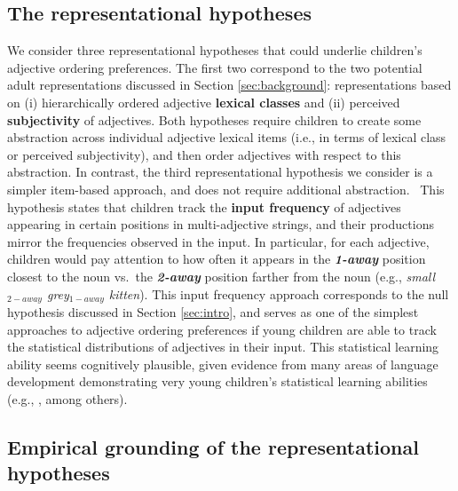 \documentclass[10pt]{article}
\newcommand{\gcs}[1]{\textcolor{blue}{[gcs: #1]}}
\begin{document}
\subsection{The representational hypotheses}
We consider three representational hypotheses that could underlie children's adjective ordering preferences. The first two correspond to the two potential adult representations discussed in Section \ref{sec:background}: representations based on (i) hierarchically ordered adjective \textbf{lexical classes} and 
(ii) perceived \textbf{subjectivity} of adjectives.
Both hypotheses require children to create some abstraction across individual adjective lexical items (i.e., in terms of lexical class or perceived subjectivity), and then order adjectives with respect to this abstraction.
In contrast, the third representational hypothesis we consider is a simpler item-based approach, and does not require additional abstraction. 
\
This hypothesis states that children track the \textbf{input frequency} of adjectives appearing in certain positions in multi-adjective strings, and their productions mirror the frequencies observed in the input. In particular, for each adjective, children would pay attention to how often it appears in the \textbf{\textit{1-away}} position closest to the noun vs.~the \textbf{\textit{2-away}} position farther from the noun (e.g., 
\textit{small$_{2-away}$ grey$_{1-away}$ kitten}).
This input frequency approach corresponds to the null hypothesis discussed in Section \ref{sec:intro}, and serves as one of the simplest approaches to adjective ordering preferences if young children are able to track the statistical distributions of adjectives in their input. This statistical learning ability seems cognitively plausible, given evidence from many areas of language development demonstrating very young children's statistical learning abilities
(e.g., \citealt{saffranetal1996,mayeetal2002,gerken2006,mintz2006,xutenenbaum2007,mayeetal2008,smithyu2008,dewarxu2010,feldmanetal2013,gerkenknight2015,gerkenquam2017}, among others).


\subsection{Empirical grounding of the  representational hypotheses}
\end{document}
